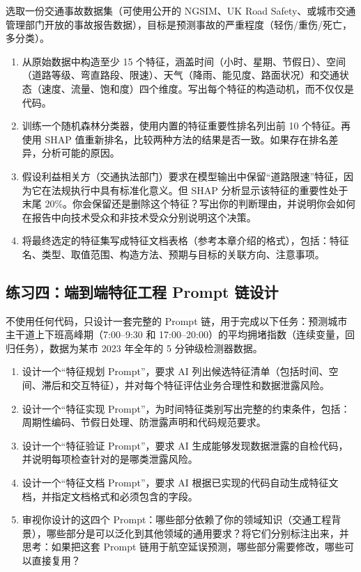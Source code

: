 选取一份交通事故数据集（可使用公开的 NGSIM、UK Road Safety、或城市交通管理部门开放的事故报告数据），目标是预测事故的严重程度（轻伤/重伤/死亡，多分类）。

\begin{enumerate}
  \item 从原始数据中构造至少 15 个特征，涵盖时间（小时、星期、节假日）、空间（道路等级、弯直路段、限速）、天气（降雨、能见度、路面状况）和交通状态（速度、流量、饱和度）四个维度。写出每个特征的构造动机，而不仅仅是代码。
  \item 训练一个随机森林分类器，使用内置的特征重要性排名列出前 10 个特征。再使用 SHAP 值重新排名，比较两种方法的结果是否一致。如果存在排名差异，分析可能的原因。
  \item 假设利益相关方（交通执法部门）要求在模型输出中保留“道路限速”特征，因为它在法规执行中具有标准化意义。但 SHAP 分析显示该特征的重要性处于末尾 20\%。你会保留还是删除这个特征？写出你的判断理由，并说明你会如何在报告中向技术受众和非技术受众分别说明这个决策。
  \item 将最终选定的特征集写成特征文档表格（参考本章介绍的格式），包括：特征名、类型、取值范围、构造方法、预期与目标的关联方向、注意事项。
\end{enumerate}

\subsection*{练习四：端到端特征工程 Prompt 链设计}

不使用任何代码，只设计一套完整的 Prompt 链，用于完成以下任务：预测城市主干道上下班高峰期（7:00--9:30 和 17:00--20:00）的平均拥堵指数（连续变量，回归任务），数据为某市 2023 年全年的 5 分钟级检测器数据。

\begin{enumerate}
  \item 设计一个“特征规划 Prompt”，要求 AI 列出候选特征清单（包括时间、空间、滞后和交互特征），并对每个特征评估业务合理性和数据泄露风险。
  \item 设计一个“特征实现 Prompt”，为时间特征类别写出完整的约束条件，包括：周期性编码、节假日处理、防泄露声明和代码规范要求。
  \item 设计一个“特征验证 Prompt”，要求 AI 生成能够发现数据泄露的自检代码，并说明每项检查针对的是哪类泄露风险。
  \item 设计一个“特征文档 Prompt”，要求 AI 根据已实现的代码自动生成特征文档，并指定文档格式和必须包含的字段。
  \item 审视你设计的这四个 Prompt：哪些部分依赖了你的领域知识（交通工程背景），哪些部分是可以泛化到其他领域的通用要求？将它们分别标注出来，并思考：如果把这套 Prompt 链用于航空延误预测，哪些部分需要修改，哪些可以直接复用？
\end{enumerate}





